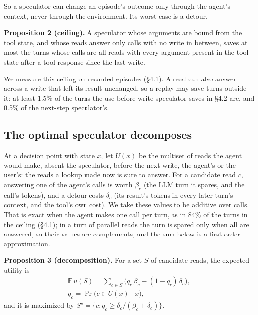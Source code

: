 \documentclass[10pt,twocolumn,letterpaper]{article}
\newcommand{\runin}[1]{{\sffamily\bfseries\color{accent}#1}}
\begin{document}
So a speculator can change an episode's outcome only through the agent's context, never through the environment. Its worst case is a detour.

\begin{prop}
\runin{Proposition 2 (ceiling).} A speculator whose arguments are bound from the tool state, and whose reads answer only calls with no write in between, saves at most the turns whose calls are all reads with every argument present in the tool state after a tool response since the last write.
\end{prop}

We measure this ceiling on recorded episodes (§4.1). A read can also answer across a write that left its result unchanged, so a replay may save turns outside it: at least 1.5\% of the turns the use-before-write speculator saves in §4.2 are, and 0.5\% of the next-step speculator's.

\hypertarget{the-optimal-speculator-decomposes}{%
\subsection{The optimal speculator decomposes}\label{the-optimal-speculator-decomposes}}

At a decision point with state \(x\), let \(U(x)\) be the multiset of reads the agent would make, absent the speculator, before the next write, the agent's or the user's: the reads a lookup made now is sure to answer. For a candidate read \(c\), answering one of the agent's calls is worth \(\beta_c\) (the LLM turn it spares, and the call's tokens), and a detour costs \(\delta_c\) (its result's tokens in every later turn's context, and the tool's own cost). We take these values to be additive over calls. That is exact when the agent makes one call per turn, as in 84\% of the turns in the ceiling (§4.1); in a turn of parallel reads the turn is spared only when all are answered, so their values are complements, and the sum below is a first-order approximation.

\begin{prop}
\runin{Proposition 3 (decomposition).} For a set \(S\) of candidate reads, the expected utility is \begin{gather*}\mathbb E\,u(S) = \sum_{c \in S} \big(q_c\,\beta_c - (1-q_c)\,\delta_c\big),\\ q_c = \Pr\big(c \in U(x) \mid x\big),\end{gather*} and it is maximized by \(S^\star = \{c : q_c \ge \delta_c / (\beta_c + \delta_c)\}\).
\end{prop}
\end{document}
